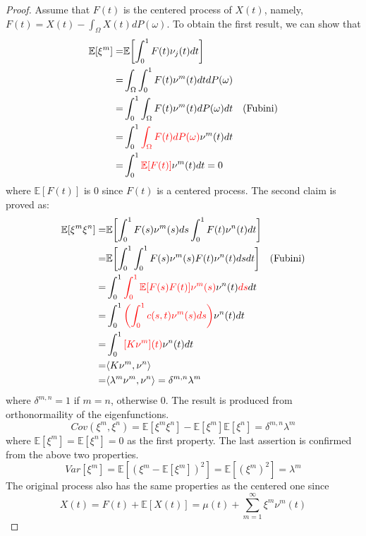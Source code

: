 \documentclass[11pt,twoside,a4paper]{article}
\begin{document}
	\begin{proof}
		Assume that $F(t)$ is the centered process of $X(t)$, namely, $F(t) = X(t) - \int_{\Omega}X(t)dP(\omega)$. To obtain the first result, we can show that
		\begin{equation}\label{Lemma1}
			\begin{split}
				\mathbb{E}[\xi^m] = & \mathbb{E} \biggl\lbrack \int_{0}^{1} F(t) \nu_{j}(t)dt\biggr\rbrack\\
				= & \int_{\Omega} \int_{0}^{1} F(t) \nu^m(t) dt dP(\omega)\\
				= & \int_{0}^{1} \int_{\Omega} F(t) \nu^m(t) dP(\omega) dt \quad \text{(Fubini)}\\
				= & \int_{0}^{1} {\color{red}\int_{\Omega} F(t) dP(\omega)} \nu^m(t) dt\\
				= & \int_{0}^{1} {\color{red}\mathbb{E}[F(t)]} \nu^m(t) dt = 0
			\end{split}
		\end{equation}
		where $\mathbb{E}[F(t)]$ is 0 since $F(t)$ is a centered process.
		The second claim is proved as:
		\begin{equation}\label{Lemma2}
			\begin{split}
				\mathbb{E} [\xi^m \xi^n] = & \mathbb{E}  \biggl\lbrack \int_{0}^{1} F(s) \nu^m(s)ds \int_{0}^{1} F(t) \nu^n(t)dt  \biggr\rbrack\\
				= & \mathbb{E} \biggl\lbrack {\int_{0}^{1} \int_{0}^{1} F(s) \nu^m(s) F(t) \nu^n(t) ds dt} \biggr\rbrack \quad \text{(Fubini)}\\
				= & \int_{0}^{1} {\color{red}\int_{0}^{1} \mathbb{E}[{F(s)F(t)}] \nu^m(s)} \nu^n(t) {\color{red}ds} dt\\
				= & \int_{0}^{1} {\color{red}\left(\int_{0}^{1}c(s,t)\nu^m(s)ds \right)} \nu^n(t) dt \\
				= & \int_{0}^{1}{\color{red}[K\nu^m](t)}\nu^n(t)dt\\
				= & \langle K \nu^m, \nu^n \rangle\\
				= & \langle \lambda^m \nu^m, \nu^n \rangle = \delta^{m,n}\lambda^{m}
			\end{split}
		\end{equation}
		where $\delta^{m,n} = 1$ if $m = n$, otherwise 0. The result is produced from orthonormaility of the eigenfunctions.
		\begin{equation}
			Cov\left(\xi^m, \xi^n\right) = \mathbb{E}[\xi^m \xi^n] - \mathbb{E}[\xi^m]\mathbb{E}[\xi^n] = \delta^{m,n}\lambda^{m}
		\end{equation}
		where $\mathbb{E}[\xi^m] = \mathbb{E}[\xi^n] = 0$ as the first property.
		The last assertion is confirmed from the above two properties.
		\begin{equation}\label{Lemma3}
			Var[\xi^m] = \mathbb{E}\left[(\xi^m - \mathbb{E}[\xi^m])^{2}\right] = \mathbb{E}[(\xi^m)^{2}] =\lambda^m
		\end{equation}
		The original process also has the same properties as the centered one since
		\begin{equation}
			X(t) = F(t) + \mathbb{E}[X(t)] = \mu(t) + \sum_{m=1}^{\infty}\xi^m\nu^m(t)
		\end{equation}
	\end{proof}
	
\end{document}
